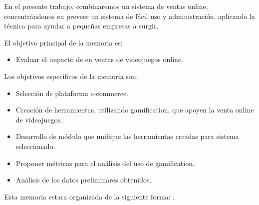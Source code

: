 En el presente trabajo, combinaremos un sistema de ventas online, concentrándonos
en proveer un sistema de fácil uso y administración, aplicando la técnica {\GAM}
para ayudar a pequeñas empresas a surgir.

El objetivo principal de la memoria es:

\begin{itemize}
    \item Evaluar el impacto de {\GAM} en ventas de videojuegos online.
\end{itemize}

Los objetivos especificos de la memoria son:
\begin{itemize}
    \item Selección de plataforma e-commerce.
    \item Creación de herramientas, utilizando gamification, que apoyen la
          venta online de videojuegos.
    \item Desarrollo de módulo que unifique las herramientas creadas para sistema
          seleccionado.
    \item Proponer métricas para el análisis del uso de gamification.
    \item Análisis de los datos preliminares obtenidos.
\end{itemize}

Esta memoria estara organizada de la siguiente forma:
.
